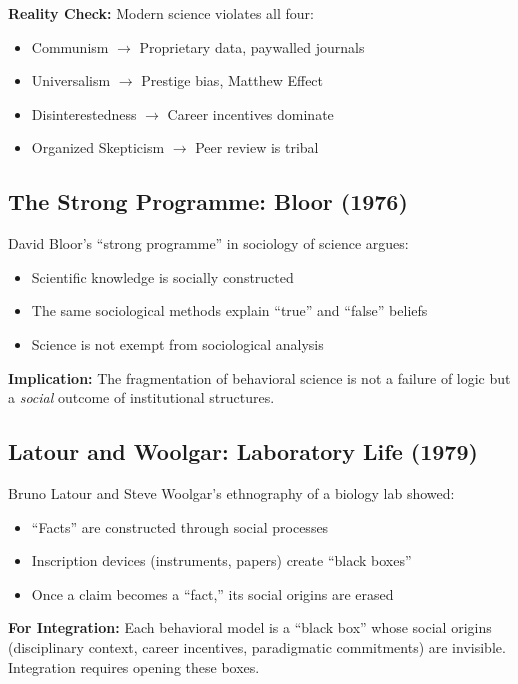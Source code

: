 \documentclass[12pt,a4paper]{article}
\begin{document}
\textbf{Reality Check:}
Modern science violates all four:
\begin{itemize}
\item Communism $\to$ Proprietary data, paywalled journals
\item Universalism $\to$ Prestige bias, Matthew Effect
\item Disinterestedness $\to$ Career incentives dominate
\item Organized Skepticism $\to$ Peer review is tribal
\end{itemize}

\subsection{The Strong Programme: Bloor (1976)}

David Bloor's ``strong programme'' in sociology of science argues:
\begin{itemize}
\item Scientific knowledge is socially constructed
\item The same sociological methods explain ``true'' and ``false'' beliefs
\item Science is not exempt from sociological analysis
\end{itemize}

\textbf{Implication:}
The fragmentation of behavioral science is not a failure of logic but a \textit{social} outcome of institutional structures.

\subsection{Latour and Woolgar: Laboratory Life (1979)}

Bruno Latour and Steve Woolgar's ethnography of a biology lab showed:
\begin{itemize}
\item ``Facts'' are constructed through social processes
\item Inscription devices (instruments, papers) create ``black boxes''
\item Once a claim becomes a ``fact,'' its social origins are erased
\end{itemize}

\textbf{For Integration:}
Each behavioral model is a ``black box'' whose social origins (disciplinary context, career incentives, paradigmatic commitments) are invisible. Integration requires opening these boxes.
\end{document}
